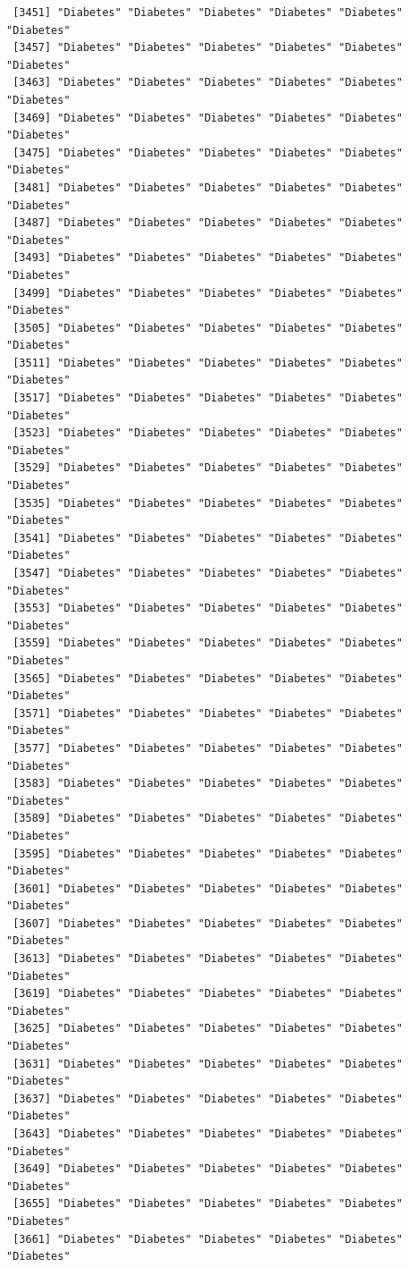 \documentclass[
  letterpaper,
  DIV=11,
  numbers=noendperiod]{scrartcl}
\begin{document}
\begin{verbatim}
 [3451] "Diabetes" "Diabetes" "Diabetes" "Diabetes" "Diabetes" "Diabetes"
 [3457] "Diabetes" "Diabetes" "Diabetes" "Diabetes" "Diabetes" "Diabetes"
 [3463] "Diabetes" "Diabetes" "Diabetes" "Diabetes" "Diabetes" "Diabetes"
 [3469] "Diabetes" "Diabetes" "Diabetes" "Diabetes" "Diabetes" "Diabetes"
 [3475] "Diabetes" "Diabetes" "Diabetes" "Diabetes" "Diabetes" "Diabetes"
 [3481] "Diabetes" "Diabetes" "Diabetes" "Diabetes" "Diabetes" "Diabetes"
 [3487] "Diabetes" "Diabetes" "Diabetes" "Diabetes" "Diabetes" "Diabetes"
 [3493] "Diabetes" "Diabetes" "Diabetes" "Diabetes" "Diabetes" "Diabetes"
 [3499] "Diabetes" "Diabetes" "Diabetes" "Diabetes" "Diabetes" "Diabetes"
 [3505] "Diabetes" "Diabetes" "Diabetes" "Diabetes" "Diabetes" "Diabetes"
 [3511] "Diabetes" "Diabetes" "Diabetes" "Diabetes" "Diabetes" "Diabetes"
 [3517] "Diabetes" "Diabetes" "Diabetes" "Diabetes" "Diabetes" "Diabetes"
 [3523] "Diabetes" "Diabetes" "Diabetes" "Diabetes" "Diabetes" "Diabetes"
 [3529] "Diabetes" "Diabetes" "Diabetes" "Diabetes" "Diabetes" "Diabetes"
 [3535] "Diabetes" "Diabetes" "Diabetes" "Diabetes" "Diabetes" "Diabetes"
 [3541] "Diabetes" "Diabetes" "Diabetes" "Diabetes" "Diabetes" "Diabetes"
 [3547] "Diabetes" "Diabetes" "Diabetes" "Diabetes" "Diabetes" "Diabetes"
 [3553] "Diabetes" "Diabetes" "Diabetes" "Diabetes" "Diabetes" "Diabetes"
 [3559] "Diabetes" "Diabetes" "Diabetes" "Diabetes" "Diabetes" "Diabetes"
 [3565] "Diabetes" "Diabetes" "Diabetes" "Diabetes" "Diabetes" "Diabetes"
 [3571] "Diabetes" "Diabetes" "Diabetes" "Diabetes" "Diabetes" "Diabetes"
 [3577] "Diabetes" "Diabetes" "Diabetes" "Diabetes" "Diabetes" "Diabetes"
 [3583] "Diabetes" "Diabetes" "Diabetes" "Diabetes" "Diabetes" "Diabetes"
 [3589] "Diabetes" "Diabetes" "Diabetes" "Diabetes" "Diabetes" "Diabetes"
 [3595] "Diabetes" "Diabetes" "Diabetes" "Diabetes" "Diabetes" "Diabetes"
 [3601] "Diabetes" "Diabetes" "Diabetes" "Diabetes" "Diabetes" "Diabetes"
 [3607] "Diabetes" "Diabetes" "Diabetes" "Diabetes" "Diabetes" "Diabetes"
 [3613] "Diabetes" "Diabetes" "Diabetes" "Diabetes" "Diabetes" "Diabetes"
 [3619] "Diabetes" "Diabetes" "Diabetes" "Diabetes" "Diabetes" "Diabetes"
 [3625] "Diabetes" "Diabetes" "Diabetes" "Diabetes" "Diabetes" "Diabetes"
 [3631] "Diabetes" "Diabetes" "Diabetes" "Diabetes" "Diabetes" "Diabetes"
 [3637] "Diabetes" "Diabetes" "Diabetes" "Diabetes" "Diabetes" "Diabetes"
 [3643] "Diabetes" "Diabetes" "Diabetes" "Diabetes" "Diabetes" "Diabetes"
 [3649] "Diabetes" "Diabetes" "Diabetes" "Diabetes" "Diabetes" "Diabetes"
 [3655] "Diabetes" "Diabetes" "Diabetes" "Diabetes" "Diabetes" "Diabetes"
 [3661] "Diabetes" "Diabetes" "Diabetes" "Diabetes" "Diabetes" "Diabetes"

\end{verbatim}
\end{document}
